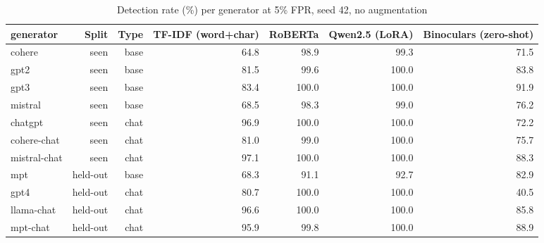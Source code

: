 \begin{table}[!t]
\centering
\caption{Detection rate (\%) per generator at 5\% FPR, seed 42, no augmentation}
\label{tab:per_generator}
\footnotesize
\begin{tabular}{lrrrrrr}
\toprule
\textbf{generator} & \textbf{Split} & \textbf{Type} & \textbf{TF-IDF (word+char)} & \textbf{RoBERTa} & \textbf{Qwen2.5 (LoRA)} & \textbf{Binoculars (zero-shot)} \\
\midrule
cohere & seen & base & 64.8 & 98.9 & 99.3 & 71.5 \\
gpt2 & seen & base & 81.5 & 99.6 & 100.0 & 83.8 \\
gpt3 & seen & base & 83.4 & 100.0 & 100.0 & 91.9 \\
mistral & seen & base & 68.5 & 98.3 & 99.0 & 76.2 \\
chatgpt & seen & chat & 96.9 & 100.0 & 100.0 & 72.2 \\
cohere-chat & seen & chat & 81.0 & 99.0 & 100.0 & 75.7 \\
mistral-chat & seen & chat & 97.1 & 100.0 & 100.0 & 88.3 \\
mpt & held-out & base & 68.3 & 91.1 & 92.7 & 82.9 \\
gpt4 & held-out & chat & 80.7 & 100.0 & 100.0 & 40.5 \\
llama-chat & held-out & chat & 96.6 & 100.0 & 100.0 & 85.8 \\
mpt-chat & held-out & chat & 95.9 & 99.8 & 100.0 & 88.9 \\
\bottomrule
\end{tabular}
\end{table}
